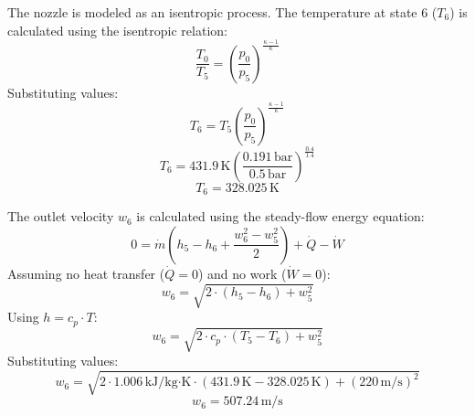 The nozzle is modeled as an isentropic process. The temperature at state 6 (\( T_6 \)) is calculated using the isentropic relation:  
\[
\frac{T_0}{T_5} = \left( \frac{p_0}{p_5} \right)^{\frac{\kappa-1}{\kappa}}
\]  
Substituting values:  
\[
T_6 = T_5 \left( \frac{p_0}{p_5} \right)^{\frac{\kappa-1}{\kappa}}
\]  
\[
T_6 = 431.9 \, \text{K} \left( \frac{0.191 \, \text{bar}}{0.5 \, \text{bar}} \right)^{\frac{0.4}{1.4}}
\]  
\[
T_6 = 328.025 \, \text{K}
\]  

The outlet velocity \( w_6 \) is calculated using the steady-flow energy equation:  
\[
0 = \dot{m} \left( h_5 - h_6 + \frac{w_6^2 - w_5^2}{2} \right) + \dot{Q} - \dot{W}
\]  
Assuming no heat transfer (\( \dot{Q} = 0 \)) and no work (\( \dot{W} = 0 \)):  
\[
w_6 = \sqrt{2 \cdot (h_5 - h_6) + w_5^2}
\]  
Using \( h = c_p \cdot T \):  
\[
w_6 = \sqrt{2 \cdot c_p \cdot (T_5 - T_6) + w_5^2}
\]  
Substituting values:  
\[
w_6 = \sqrt{2 \cdot 1.006 \, \text{kJ/kg·K} \cdot (431.9 \, \text{K} - 328.025 \, \text{K}) + (220 \, \text{m/s})^2}
\]  
\[
w_6 = 507.24 \, \text{m/s}
\]
